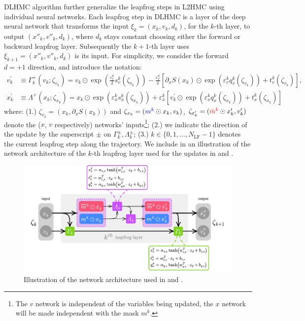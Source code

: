 \documentclass{article} %
\newcommand{\mbart}{\textcolor{red}{\bar{m}^{k}}}
\newcommand{\mt}{\textcolor{blue}{m^{k}}}
\begin{document}
DLHMC algorithm further generalize the leapfrog steps in L2HMC using individual neural networks.
Each leapfrog step in DLHMC is a layer of the deep neural network that transforms the input $\xi_k=(x_k,v_k,d_k)$, for the $k$-th layer,
to output $(x''_k,v''_k,d_k)$, where $d_k$ stays constant choosing either the forward or backward leapfrog layer.
Subsequently the $k+1$-th layer uses $\xi_{k+1}=(x''_k,v''_k,d_k)$ is its input.
For simplicity, we consider the forward \(d=+1\) direction, and introduce the notation:
%
\begin{align}
   v^{\prime}_{k} &\equiv \Gamma^{+}_{k}(v_{k};\zeta_{v_{k}})
   = v_{k}\odot \exp{\left(\tfrac{\varepsilon^{k}_{v}}{2}s_{v}^{k}(\zeta_{v_{k}})\right)} -
   \tfrac{\varepsilon^{k}_{v}}{2}{\left[\partial_{x}S(x_{k})\odot\exp{\left(\varepsilon^{k}_{v} q_{v}^{k}(\zeta_{v_{k}})\right)}
      +t_{v}^{k}(\zeta_{v_{k}})\right]},\label{eq:newmomentumupdate}\\
   x^{\prime}_{k} &\equiv \Lambda^{+}(x_{k};\zeta_{x_{k}})
   = x_{k}\odot\exp(\varepsilon^{k}_{x} s^{k}_{x}(\zeta_{x_{k}}))
   + \varepsilon^{k}_{x}\left[v^{\prime}_{k}\odot\exp(\varepsilon^{k}_{x} q^{k}_{x}(\zeta_{x_{k}}))
         + t^{k}_{x}(\zeta_{x_{k}})\right]\label{eq:newpositionupdate}
\end{align}
%
where: (1.) \(\zeta_{v_{k}} = (x_{k}, \partial_{x}S(x_{k}))\) and \(\zeta_{x_{k}} = (\mt\odot x_{k}, v_{k})\),
\(\zeta_{x_{k}^{\prime}} = (\mbart\odot x_{k}^{\prime}, v_{k}^{\prime})\) denote the (\(x\),
\(v\) respectively) networks' inputs\footnote{%
   The \(v\) network is independent of the variables being updated,
 the $x$ network will be made independent with the mask $m^k$.};
  (2.) we indicate the direction of the update by the superscript \(\pm\) on \(\Gamma^{\pm}_{k},
\Lambda^{\pm}_{k}\); (3.) \(k\in\{0,1,\ldots,N_{\mathrm{LF}}-1\}\) denotes the current leapfrog step along the trajectory.
%
We include in  an illustration of the network architecture of the $k$-th leapfrog layer
used for the updates in  and .
%
\begin{figure}[htpb]
   \centering
   \includegraphics[width=\textwidth]{figures/lflayer.pdf}
   \caption{\label{fig:network}Illustration of the network architecture used in  and .}
\end{figure}
\end{document}
